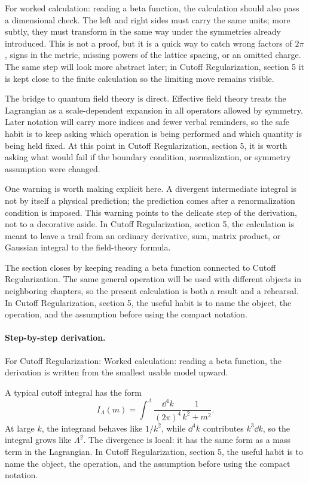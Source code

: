 For worked calculation: reading a beta function, the calculation should also pass a dimensional check.  The left and right sides must carry the same units; more subtly, they must transform in the same way under the symmetries already introduced.  This is not a proof, but it is a quick way to catch wrong factors of \(2\pi\), signs in the metric, missing powers of the lattice spacing, or an omitted charge.  The same step will look more abstract later; in Cutoff Regularization, section 5 it is kept close to the finite calculation so the limiting move remains visible.

The bridge to quantum field theory is direct.  Effective field theory treats the Lagrangian as a scale-dependent expansion in all operators allowed by symmetry.  Later notation will carry more indices and fewer verbal reminders, so the safe habit is to keep asking which operation is being performed and which quantity is being held fixed.  At this point in Cutoff Regularization, section 5, it is worth asking what would fail if the boundary condition, normalization, or symmetry assumption were changed.

One warning is worth making explicit here.  A divergent intermediate integral is not by itself a physical prediction; the prediction comes after a renormalization condition is imposed.  This warning points to the delicate step of the derivation, not to a decorative aside.  In Cutoff Regularization, section 5, the calculation is meant to leave a trail from an ordinary derivative, sum, matrix product, or Gaussian integral to the field-theory formula.

The section closes by keeping reading a beta function connected to Cutoff Regularization.  The same general operation will be used with different objects in neighboring chapters, so the present calculation is both a result and a rehearsal.  In Cutoff Regularization, section 5, the useful habit is to name the object, the operation, and the assumption before using the compact notation.



\paragraph{Step-by-step derivation.}

For Cutoff Regularization: Worked calculation: reading a beta function, the derivation is written from the smallest usable model upward.

A typical cutoff integral has the form
\[
  I_\Lambda(m)=\int^{\Lambda}\frac{\dd^4k}{(2\pi)^4}\frac{1}{k^2+m^2}.
\]
At large \(k\), the integrand behaves like \(1/k^2\), while \(\dd^4k\) contributes \(k^3\dd k\), so the integral grows like \(\Lambda^2\).  The divergence is local: it has the same form as a mass term in the Lagrangian.  In Cutoff Regularization, section 5, the useful habit is to name the object, the operation, and the assumption before using the compact notation.

